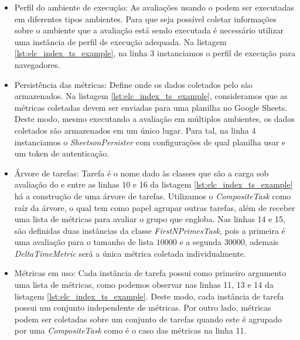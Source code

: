 \documentclass[12pt]{tcc}
\begin{document}
	\begin{itemize}
		\item Perfil do ambiente de execução: As avaliações usando o  podem ser executadas em diferentes tipos ambientes.
		Para que seja possível coletar informações sobre o ambiente que a avaliação está sendo executada é necessário utilizar uma instância de perfil de execução adequada.
		Na listagem \ref{lst:elc_index_ts_example}, na linha 3 instanciamos o perfil de execução para navegadores.

		\item Persistência das métricas: Define onde os dados coletados pelo  são armazenados.
		Na listagem \ref{lst:elc_index_ts_example}, consideramos que as métricas coletadas devem ser enviadas para uma planilha no Google Sheets.
		Deste modo, mesmo executando a avaliação em múltiplos ambientes, os dados coletados são armazenados em um único lugar.
		Para tal, na linha 4 instanciamos o \emph{SheetsonPersister} com configurações de qual planilha usar e um token de autenticação.

		\item Árvore de tarefas: Tarefa é o nome dado às classes que são a carga sob avaliação do  e entre as linhas 10 e 16 da listagem \ref{lst:elc_index_ts_example} há a construção de uma árvore de tarefas.
		Utilizamos o \emph{CompositeTask} como raíz da árvore, o qual tem como papel agrupar outras tarefas, além de receber uma lista de métricas para avaliar o grupo que engloba.
		Nas linhas 14 e 15, são definidas duas instâncias da classe \emph{FirstNPrimesTask}, pois a primeira é uma avaliação para o tamanho de lista $10000$ e a segunda $30000$, ademais \emph{DeltaTimeMetric} será a única métrica coletada individualmente.

		\item Métricas em uso: Cada instância de tarefa possui como primeiro argumento uma lista de métricas, como podemos observar nas linhas 11, 13 e 14 da listagem \ref{lst:elc_index_ts_example}.
		Deste modo, cada instância de tarefa possui um conjunto independente de métricas.
		Por outro lado, métricas podem ser coletadas sobre um conjunto de tarefas quando este é agrupado por uma \emph{CompositeTask} como é o caso das métricas na linha 11.
	\end{itemize}
\end{document}
